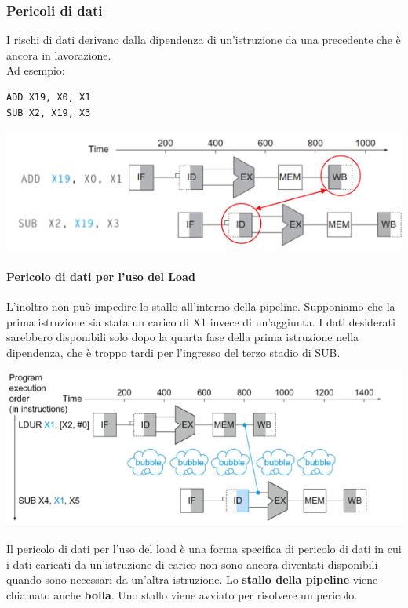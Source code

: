 \documentclass[12pt,a4paper]{article}
\begin{document}
\subsubsection{Pericoli di dati}
I rischi di dati derivano dalla dipendenza di un'istruzione da una precedente che è ancora in lavorazione.\\
Ad esempio:
\begin{center}
\begin{minipage}{.2\linewidth}
\begin{verbatim}
ADD X19, X0, X1
SUB X2, X19, X3
\end{verbatim}
\end{minipage}
\end{center}
\begin{center}
\includegraphics[width=0.6\columnwidth]{img/data_hazard.png}
\end{center}

\paragraph{Pericolo di dati per l'uso del Load}
L'inoltro non può impedire lo stallo all'interno della pipeline. Supponiamo che la prima istruzione sia stata un carico di X1 invece di un'aggiunta. I dati desiderati sarebbero disponibili solo dopo la quarta fase della prima istruzione nella dipendenza, che è troppo tardi per l'ingresso del terzo stadio di SUB.
\begin{center}
\includegraphics[width=0.6\columnwidth]{img/load-use.png}
\end{center}
Il pericolo di dati per l'uso del load è una forma specifica di pericolo di dati in cui i dati caricati da un'istruzione di carico non sono ancora diventati disponibili quando sono necessari da un'altra istruzione.
Lo \textbf{stallo della pipeline} viene chiamato anche \textbf{bolla}. Uno stallo viene avviato per risolvere un pericolo.
\end{document}
